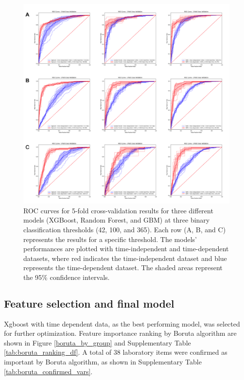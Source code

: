 \documentclass[final,1p,times,authoryear]{elsarticle}
\begin{document}
\begin{figure}[t] 
    \centering 
    \includegraphics[width=\textwidth]{figures/kfoldfirst3.png} 
    \caption{ROC curves for 5-fold cross-validation results for three different models (XGBoost, Random Forest, and GBM) at three binary classification thresholds (42, 100, and 365). Each row (A, B, and C) represents the results for a specific threshold. The models' performances are plotted with time-independent and time-dependent datasets, where red indicates the time-independent dataset and blue represents the time-dependent dataset. The shaded areas represent the 95\% confidence intervals.}\label{kfoldfirst3} 
\end{figure}


\subsection{Feature selection and final model}\label{FinalModel}

Xgboost with time dependent data, as the best performing model, was selected for further optimization. Feature importance ranking by Boruta algorithm are shown in Figure \ref{boruta_by_group} and Supplementary Table \ref{tab:boruta_ranking_df}. A total of 38 laboratory items were confirmed as important by Boruta algorithm, as shown in Supplementary Table \ref{tab:boruta_confirmed_vars}.
\end{document}
